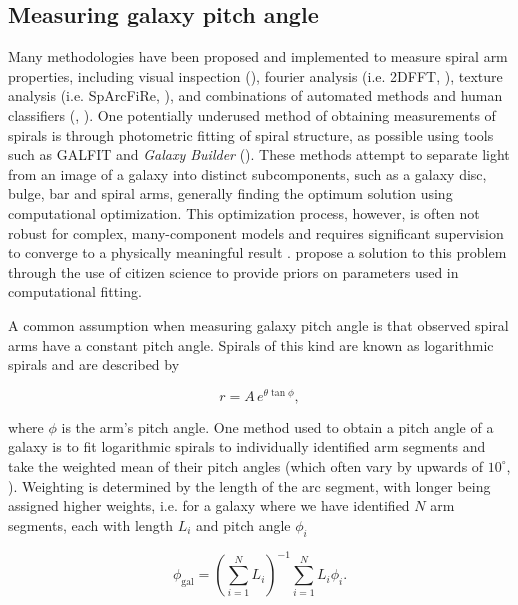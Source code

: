 \subsection{Measuring galaxy pitch angle}

Many methodologies have been proposed and implemented to measure spiral arm properties, including visual inspection (\citealt{2015A&A...582A..86H}), fourier analysis (i.e. \textsc{2DFFT}, \citealt{2012ApJS..199...33D}), texture analysis (i.e. SpArcFiRe, \citealt{2014ApJ...790...87D}), and combinations of automated methods and human classifiers (\citealt{2017MNRAS.472.2263H}, \citealt{2020MNRAS.493.3854H}). One potentially underused method of obtaining measurements of spirals is through photometric fitting of spiral structure, as possible using tools such as \textsc{GALFIT} \citep{2010AJ....139.2097P} and \textit{Galaxy Builder} (\Lingard). These methods attempt to separate light from an image of a galaxy into distinct subcomponents, such as a galaxy disc, bulge, bar and spiral arms, generally finding the optimum solution using computational optimization. This optimization process, however, is often not robust for complex, many-component models and requires significant supervision to converge to a physically meaningful result \citep{Gao2017:1709.00746v1}. \Lingard propose a solution to this problem through the use of citizen science to provide priors on parameters used in computational fitting.

A common assumption when measuring galaxy pitch angle is that observed spiral arms have a constant pitch angle. Spirals of this kind are known as logarithmic spirals and are described by

\begin{equation}
r = A\,e^{\theta\tan\phi},
\end{equation}

where $\phi$ is the arm's pitch angle. One method used to obtain a pitch angle of a galaxy is to fit logarithmic spirals to individually identified arm segments and take the weighted mean of their pitch angles (which often vary by upwards of $10^\circ$, \citealt{2014ApJ...790...87D}). Weighting is determined by the length of the arc segment, with longer being assigned higher weights, i.e. for a galaxy where we have identified $N$ arm segments, each with length $L_i$ and pitch angle $\phi_i$

\begin{equation}
  \phi_\mathrm{gal} = \left(\sum_{i=1}^{N}L_i\right)^{-1}\sum_{i=1}^{N}L_i \phi_i.
\end{equation}

